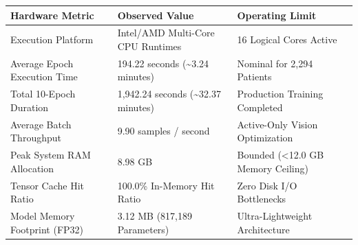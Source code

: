 \begin{tabular}{lll}
\toprule
Hardware Metric & Observed Value & Operating Limit \\
\midrule
Execution Platform & Intel/AMD Multi-Core CPU Runtimes & 16 Logical Cores Active \\
Average Epoch Execution Time & 194.22 seconds (\textasciitilde 3.24 minutes) & Nominal for 2,294 Patients \\
Total 10-Epoch Duration & 1,942.24 seconds (\textasciitilde 32.37 minutes) & Production Training Completed \\
Average Batch Throughput & 9.90 samples / second & Active-Only Vision Optimization \\
Peak System RAM Allocation & 8.98 GB & Bounded (<12.0 GB Memory Ceiling) \\
Tensor Cache Hit Ratio & 100.0\% In-Memory Hit Ratio & Zero Disk I/O Bottlenecks \\
Model Memory Footprint (FP32) & 3.12 MB (817,189 Parameters) & Ultra-Lightweight Architecture \\
\bottomrule
\end{tabular}
